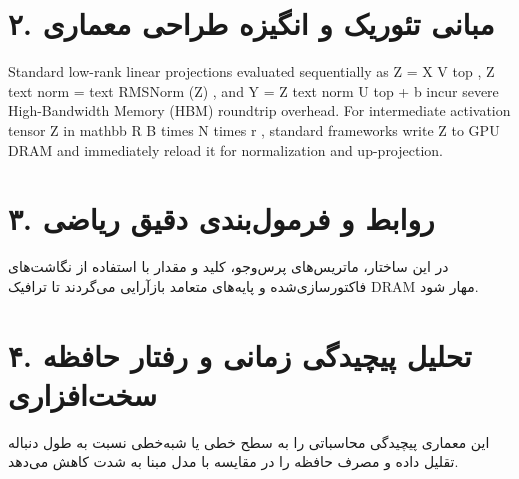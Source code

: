 \documentclass[12pt,a4paper]{article}
\begin{document}
\section*{۲. مبانی تئوریک و انگیزه طراحی معماری}
Standard low-rank linear projections evaluated sequentially as Z = X V top , Z text norm = text RMSNorm (Z) , and Y = Z text norm U top + b incur severe High-Bandwidth Memory (HBM) roundtrip overhead. For intermediate activation tensor Z in mathbb R B times N times r , standard frameworks write Z to GPU DRAM and immediately reload it for normalization and up-projection.

\section*{۳. روابط و فرمول‌بندی دقیق ریاضی}
در این ساختار، ماتریس‌های پرس‌وجو، کلید و مقدار با استفاده از نگاشت‌های فاکتورسازی‌شده و پایه‌های متعامد بازآرایی می‌گردند تا ترافیک DRAM مهار شود.

\section*{۴. تحلیل پیچیدگی زمانی و رفتار حافظه سخت‌افزاری}
این معماری پیچیدگی محاسباتی را به سطح خطی یا شبه‌خطی نسبت به طول دنباله تقلیل داده و مصرف حافظه را در مقایسه با مدل مبنا به شدت کاهش می‌دهد.
\end{document}
